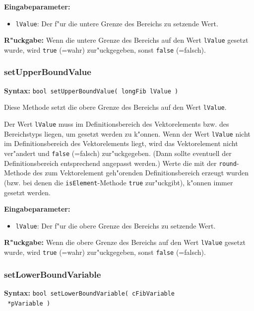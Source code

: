 \bigskip\noindent
\textbf{Eingabeparameter:}
\begin{itemize}
 \item \verb|lValue|: Der f"ur die untere Grenze des Bereichs zu setzende Wert.
\end{itemize}

\bigskip\noindent
\textbf{R"uckgabe:} Wenn die untere Grenze des Bereichs auf den Wert \verb|lValue| gesetzt wurde, wird \verb|true| (=wahr) zur"uckgegeben, sonst \verb|false| (=falsch).


\subsubsection{setUpperBoundValue}

\textbf{Syntax:} \verb|bool setUpperBoundValue( longFib lValue )|

\bigskip\noindent
Diese Methode setzt die obere Grenze des Bereichs auf den Wert \verb|lValue|.

Der Wert \verb|lValue| muss im Definitionsbereich des Vektorelements bzw. des Bereichstyps liegen, um gesetzt werden zu k"onnen. Wenn der Wert \verb|lValue| nicht im Definitionsbereich des Vektorelements liegt, wird das Vektorelement nicht ver"andert und \verb|false| (=falsch) zur"uckgegeben. (Dann sollte eventuell der Definitionsbereich entsprechend angepasst werden.) Werte die mit der \verb|round|-Methode des zum Vektorelement geh"orenden Definitionsbereich erzeugt wurden (bzw. bei denen die \verb|isElement|-Methode \verb|true| zur"uckgibt), k"onnen immer gesetzt werden.

\bigskip\noindent
\textbf{Eingabeparameter:}
\begin{itemize}
 \item \verb|lValue|: Der f"ur die obere Grenze des Bereichs zu setzende Wert.
\end{itemize}

\bigskip\noindent
\textbf{R"uckgabe:} Wenn die obere Grenze des Bereichs auf den Wert \verb|lValue| gesetzt wurde, wird \verb|true| (=wahr) zur"uckgegeben, sonst \verb|false| (=falsch).


\subsubsection{setLowerBoundVariable}

\textbf{Syntax:} \verb|bool setLowerBoundVariable( cFibVariable| \\\verb| *pVariable )|


